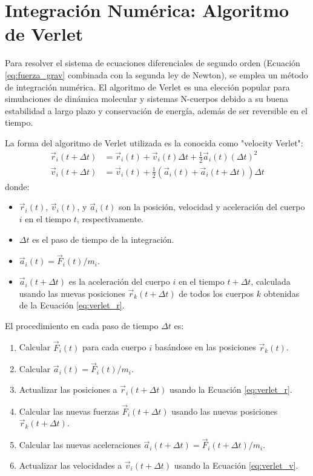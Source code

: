 \documentclass{article}
\begin{document}
\section{Integración Numérica: Algoritmo de Verlet}
Para resolver el sistema de ecuaciones diferenciales de segundo orden (Ecuación \ref{eq:fuerza_grav} combinada con la segunda ley de Newton), se emplea un método de integración numérica. El algoritmo de Verlet es una elección popular para simulaciones de dinámica molecular y sistemas N-cuerpos debido a su buena estabilidad a largo plazo y conservación de energía, además de ser reversible en el tiempo.

La forma del algoritmo de Verlet utilizada es la conocida como "velocity Verlet":
\begin{align}
\vec{r}_i(t + \Delta t) &= \vec{r}_i(t) + \vec{v}_i(t) \Delta t + \frac{1}{2} \vec{a}_i(t) (\Delta t)^2 \label{eq:verlet_r} \\
\vec{v}_i(t + \Delta t) &= \vec{v}_i(t) + \frac{1}{2} \left( \vec{a}_i(t) + \vec{a}_i(t + \Delta t) \right) \Delta t \label{eq:verlet_v}
\end{align}
donde:
\begin{itemize}
    \item $\vec{r}_i(t)$, $\vec{v}_i(t)$, y $\vec{a}_i(t)$ son la posición, velocidad y aceleración del cuerpo $i$ en el tiempo $t$, respectivamente.
    \item $\Delta t$ es el paso de tiempo de la integración.
    \item $\vec{a}_i(t) = \vec{F}_i(t) / m_i$.
    \item $\vec{a}_i(t + \Delta t)$ es la aceleración del cuerpo $i$ en el tiempo $t + \Delta t$, calculada usando las nuevas posiciones $\vec{r}_k(t + \Delta t)$ de todos los cuerpos $k$ obtenidas de la Ecuación \ref{eq:verlet_r}.
\end{itemize}
El procedimiento en cada paso de tiempo $\Delta t$ es:
\begin{enumerate}
    \item Calcular $\vec{F}_i(t)$ para cada cuerpo $i$ basándose en las posiciones $\vec{r}_k(t)$.
    \item Calcular $\vec{a}_i(t) = \vec{F}_i(t) / m_i$.
    \item Actualizar las posiciones a $\vec{r}_i(t + \Delta t)$ usando la Ecuación \ref{eq:verlet_r}.
    \item Calcular las nuevas fuerzas $\vec{F}_i(t + \Delta t)$ usando las nuevas posiciones $\vec{r}_k(t + \Delta t)$.
    \item Calcular las nuevas aceleraciones $\vec{a}_i(t + \Delta t) = \vec{F}_i(t + \Delta t) / m_i$.
    \item Actualizar las velocidades a $\vec{v}_i(t + \Delta t)$ usando la Ecuación \ref{eq:verlet_v}.
\end{enumerate}
\end{document}
